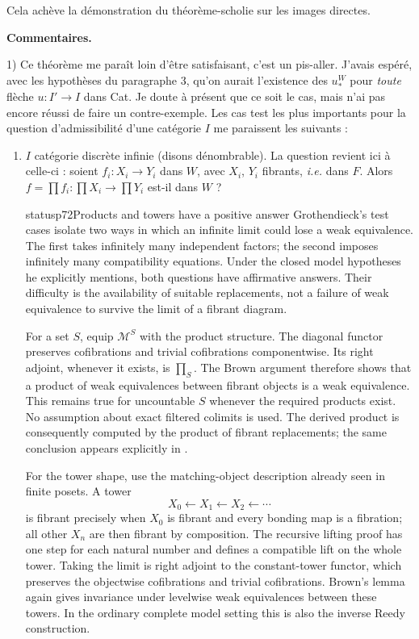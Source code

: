 Cela achève la démonstration du théorème-scholie sur les images directes.

\textbf{Commentaires.}

1) Ce théorème me paraît loin d'être satisfaisant, c'est un pis-aller. J'avais espéré, avec les hypothèses du paragraphe 3, qu'on aurait l'existence des $u_*^W$ pour \textit{toute} flèche $u : I' \longrightarrow I$ dans Cat. Je doute à présent que ce soit le cas, mais n'ai pas encore réussi de faire un contre-exemple. Les cas test les plus importants pour la question d'admissibilité d'une catégorie $I$ me paraissent les suivants :

\begin{enumerate}
\item[\textit{a})] $I$ catégorie discrète infinie (disons dénombrable). La question revient ici à celle-ci : soient $f_i : X_i \longrightarrow Y_i$ dans $W$, avec $X_i$, $Y_i$ fibrants, \textit{i.e.} dans $F$. Alors $f = \prod f_i : \prod X_i \longrightarrow \prod Y_i$ est-il dans $W$ ?


\begin{dcomment}{status}{p72}{Products and towers have a positive answer}
Grothendieck's test cases isolate two ways in which an infinite limit could lose a weak equivalence. The first takes infinitely many independent factors; the second imposes infinitely many compatibility equations. Under the closed model hypotheses he explicitly mentions, both questions have affirmative answers. Their difficulty is the availability of suitable replacements, not a failure of weak equivalence to survive the limit of a fibrant diagram.

For a set $S$, equip $\mathcal M^S$ with the product structure. The diagonal functor preserves cofibrations and trivial cofibrations componentwise. Its right adjoint, whenever it exists, is $\prod_S$. The Brown argument therefore shows that a product of weak equivalences between fibrant objects is a weak equivalence. This remains true for uncountable $S$ whenever the required products exist. No assumption about exact filtered colimits is used. The derived product is consequently computed by the product of fibrant replacements; the same conclusion appears explicitly in \citet[Example 1.3.11]{Hovey1999}.

For the tower shape, use the matching-object description already seen in finite posets. A tower
\[
                         X_0\longleftarrow X_1\longleftarrow X_2\longleftarrow\cdots
\]
is fibrant precisely when $X_0$ is fibrant and every bonding map is a fibration; all other $X_n$ are then fibrant by composition. The recursive lifting proof has one step for each natural number and defines a compatible lift on the whole tower. Taking the limit is right adjoint to the constant-tower functor, which preserves the objectwise cofibrations and trivial cofibrations. Brown's lemma again gives invariance under levelwise weak equivalences between these towers. In the ordinary complete model setting this is also the inverse Reedy construction.


\end{dcomment}
\end{enumerate}
